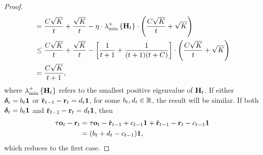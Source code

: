 \begin{proof}
\begin{equation*}
\begin{split}
    &= \frac{C \sqrt{K}}{t} + \frac{\sqrt{K}}{t} - \eta \cdot \lambda_{\min}^{+}\left\{ {\mathbf{H}}_t \right\} \cdot \left( \frac{C \sqrt{K}}{t} + \sqrt{K} \right) \\
    &\le \frac{C \sqrt{K}}{t} + \frac{\sqrt{K}}{t} - \left[ \frac{1}{t+1} + \frac{1}{(t+1)(t+C)} \right] \cdot \left( \frac{C \sqrt{K}}{t} + \sqrt{K} \right) \\
    &= \frac{C \sqrt{K}}{t+1},
\end{split}
\end{equation*}
where $\lambda_{\min}^{+}\left\{ {\mathbf{H}}_t \right\}$ refers to the smallest positive eigenvalue of ${\mathbf{H}}_t$. If either ${\boldsymbol{\delta}}_t = b_t {\mathbf{1}}$ or $\hat{{\mathbf{r}}}_{t-1} - {\mathbf{r}}_t = d_t {\mathbf{1}}$, for some $b_t, d_t \in {\mathbb{R}}$, the result will be similar. If both ${\boldsymbol{\delta}}_t = b_t {\mathbf{1}}$ and $\hat{{\mathbf{r}}}_{t-1} - {\mathbf{r}}_t = d_t {\mathbf{1}}$, then
\begin{equation*}
\begin{split}
    \tau {\mathbf{o}}_t - {\mathbf{r}}_t &= \tau {\mathbf{o}}_{t} - \hat{{\mathbf{r}}}_{t-1} + c_{t-1} {\mathbf{1}} + \hat{{\mathbf{r}}}_{t-1} - {\mathbf{r}}_t - c_{t-1} {\mathbf{1}} \\
    &= (b_t + d_t - c_{t-1}) {\mathbf{1}},
\end{split}
\end{equation*}
which reduces to the first case.
\end{proof}

